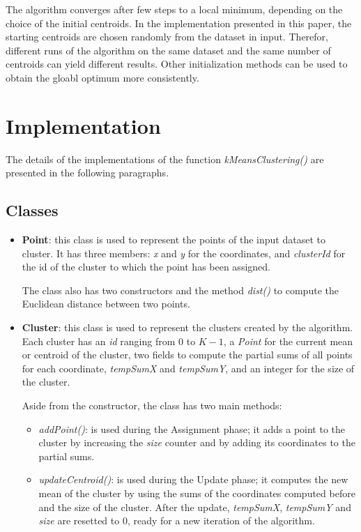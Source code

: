 \documentclass[10pt,twocolumn,letterpaper]{article}
\begin{document}
The algorithm converges after few steps to a local minimum, depending on the choice of the initial centroids. In the implementation presented in this paper, the starting centroids are chosen randomly from the dataset in input. Therefor, different runs of the algorithm on the same dataset and the same number of centroids can yield different results. Other initialization methods can be used to obtain the gloabl optimum more consistently.


\section{Implementation}
The details of the implementations of the function \textit{kMeansClustering()} are presented in the following paragraphs.

\subsection{Classes}
\begin{itemize}
	\item \textbf{Point}: this class is used to represent the points of the input dataset to cluster. It has three members: \textit{x} and \textit{y} for the coordinates, and \textit{clusterId} for the id of the cluster to which the point has been assigned. 
	
	The class also has two constructors and the method \textit{dist()} to compute the Euclidean distance between two points.
	
	\item \textbf{Cluster}: this class is used to represent the clusters created by the algorithm. Each cluster has an \textit{id} ranging from 0 to $K - 1$, a \textit{Point} for the current mean or centroid of the cluster, two fields to compute the partial sums of all points for each coordinate, \textit{tempSumX} and \textit{tempSumY}, and an integer for the size of the cluster.
	
	Aside from the constructor, the class has two main methods:
	\begin{itemize}
		\item \textit{addPoint()}: is used during the Assignment phase; it adds a point to the cluster by increasing the \textit{size} counter and by adding its coordinates to the partial sums.
		\item \textit{updateCentroid()}: is used during the Update phase; it computes the new mean of the cluster by using the sums of the coordinates computed before and the size of the cluster. After the update, \textit{tempSumX}, \textit{tempSumY} and \textit{size} are resetted to 0, ready for a new iteration of the algorithm.
	\end{itemize}
\end{itemize}
\end{document}
